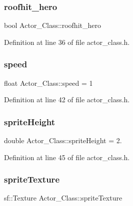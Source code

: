 \subsubsection{\texorpdfstring{roofhit\+\_\+hero}{roofhit\_hero}}
{\footnotesize\ttfamily bool Actor\+\_\+\+Class\+::roofhit\+\_\+hero}



Definition at line 36 of file actor\+\_\+class.\+h.

\hypertarget{class_actor___class_af833d1fff0db17c4e797836ffbae9f9e}{}\label{class_actor___class_af833d1fff0db17c4e797836ffbae9f9e} 
\subsubsection{\texorpdfstring{speed}{speed}}
{\footnotesize\ttfamily float Actor\+\_\+\+Class\+::speed = 1}



Definition at line 42 of file actor\+\_\+class.\+h.

\hypertarget{class_actor___class_a9788b5985fcd281bc5fe722937e7413c}{}\label{class_actor___class_a9788b5985fcd281bc5fe722937e7413c} 
\subsubsection{\texorpdfstring{sprite\+Height}{spriteHeight}}
{\footnotesize\ttfamily double Actor\+\_\+\+Class\+::sprite\+Height = 2.}



Definition at line 45 of file actor\+\_\+class.\+h.

\hypertarget{class_actor___class_a28e08b1eea7303fb8afbde256cddc081}{}\label{class_actor___class_a28e08b1eea7303fb8afbde256cddc081} 
\subsubsection{\texorpdfstring{sprite\+Texture}{spriteTexture}}
{\footnotesize\ttfamily sf\+::\+Texture Actor\+\_\+\+Class\+::sprite\+Texture}



